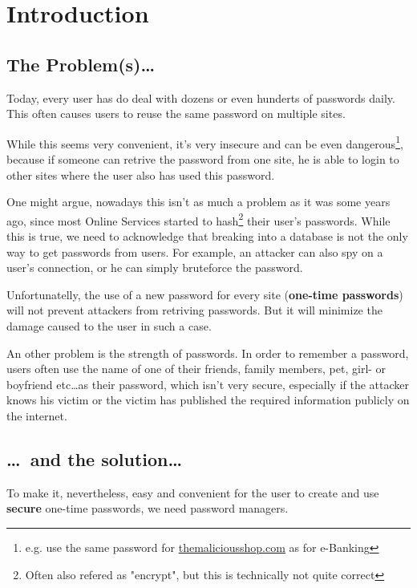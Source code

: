 \documentclass[11pt,a4paper,titlepage,portrait,english,final]{scrartcl}
\title{\docTitle}
\subtitle{\docSubtitle}
\author{\large\scshape \docAuthor \\ \large\scshape\textbf{\href{http://kije.ch}{kije-dev}}}
\date{\normalsize\scshape\docDate}
\begin{document}
\maketitle
\newpage
\tableofcontents
\newpage

\section{Introduction}
\subsection*{The Problem(s)\ldots}
Today, every user has do deal with dozens or even hunderts of passwords daily.
This often causes users to reuse the same password on multiple sites. 

While this seems very convenient, it's very insecure and can be even dangerous\footnote{e.g. use the same password for \url{themaliciousshop.com} as for e-Banking}, because if someone can retrive the password from one site, he is able to login to other sites where the user also has used this password. 

One might argue, nowadays this isn't as much a problem as it was some years ago, since most Online Services started to hash\footnote{Often also refered as "encrypt", but this is technically not quite correct} their user's passwords. While this is true, we need to acknowledge that breaking into a database is not the only way to get passwords from users. For example, an attacker can also spy on a user's connection, or he can simply bruteforce the password.

Unfortunatelly, the use of a new password for every site (\textbf{one-time passwords}) will not prevent attackers from retriving passwords. But it will minimize the damage caused to the user in such a case.

An other problem is the strength of passwords. In order to remember a password, users often use the name of one of their friends, family members, pet, girl- or boyfriend etc\ldots as their password, which isn't very secure, especially if the attacker knows his victim or the victim has published the required information publicly on the internet.

\subsection*{\ldots~and the solution\ldots}
To make it, nevertheless, easy and convenient for the user to create and use \textbf{secure} one-time passwords, we need password managers.
\end{document}
